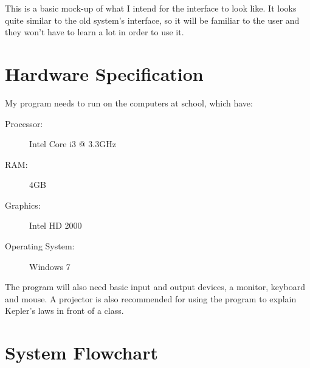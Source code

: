 This is a basic mock-up of what I intend for the interface to look like. It looks
quite similar to the old system's interface, so it will be familiar to the user
and they won't have to learn a lot in order to use it.

\section{Hardware Specification}

My program needs to run on the computers at school, which have:
\begin{description}
	\item[Processor:] Intel Core i3 @ 3.3GHz
	\item[RAM:] 4GB
	\item[Graphics:] Intel HD 2000
	\item[Operating System:] Windows 7
\end{description}

The program will also need basic input and output devices, a monitor, keyboard
and mouse. A projector is also recommended for using the program to explain
Kepler's laws in front of a class.

\section{System Flowchart}

